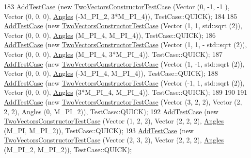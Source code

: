 \begin{DoxyCode}
183   \hyperlink{classns3_1_1TestCase_a3718088e3eefd5d6454569d2e0ddd835}{AddTestCase} (\textcolor{keyword}{new} \hyperlink{classTwoVectorsConstructorTestCase}{TwoVectorsConstructorTestCase} (Vector (0, -1, -1
      ),   Vector (0, 0, 0), \hyperlink{structns3_1_1Angles}{Angles} (-M\_PI\_2, 3*M\_PI\_4)), TestCase::QUICK);
184 
185   \hyperlink{classns3_1_1TestCase_a3718088e3eefd5d6454569d2e0ddd835}{AddTestCase} (\textcolor{keyword}{new} \hyperlink{classTwoVectorsConstructorTestCase}{TwoVectorsConstructorTestCase} (Vector (1, 1, 
      std::sqrt (2)),  Vector (0, 0, 0), \hyperlink{structns3_1_1Angles}{Angles} (M\_PI\_4, M\_PI\_4)), TestCase::QUICK);
186   \hyperlink{classns3_1_1TestCase_a3718088e3eefd5d6454569d2e0ddd835}{AddTestCase} (\textcolor{keyword}{new} \hyperlink{classTwoVectorsConstructorTestCase}{TwoVectorsConstructorTestCase} (Vector (1, 1, -
      std::sqrt (2)), Vector (0, 0, 0), \hyperlink{structns3_1_1Angles}{Angles} (M\_PI\_4, 3*M\_PI\_4)), TestCase::QUICK);
187   \hyperlink{classns3_1_1TestCase_a3718088e3eefd5d6454569d2e0ddd835}{AddTestCase} (\textcolor{keyword}{new} \hyperlink{classTwoVectorsConstructorTestCase}{TwoVectorsConstructorTestCase} (Vector (1, -1, 
      std::sqrt (2)), Vector (0, 0, 0), \hyperlink{structns3_1_1Angles}{Angles} (-M\_PI\_4, M\_PI\_4)), TestCase::QUICK);
188   \hyperlink{classns3_1_1TestCase_a3718088e3eefd5d6454569d2e0ddd835}{AddTestCase} (\textcolor{keyword}{new} \hyperlink{classTwoVectorsConstructorTestCase}{TwoVectorsConstructorTestCase} (Vector (-1, 1, 
      std::sqrt (2)), Vector (0, 0, 0), \hyperlink{structns3_1_1Angles}{Angles} (3*M\_PI\_4, M\_PI\_4)), TestCase::QUICK);
189 
190 
191   \hyperlink{classns3_1_1TestCase_a3718088e3eefd5d6454569d2e0ddd835}{AddTestCase} (\textcolor{keyword}{new} \hyperlink{classTwoVectorsConstructorTestCase}{TwoVectorsConstructorTestCase} (Vector (3, 2, 2),
           Vector (2, 2, 2), \hyperlink{structns3_1_1Angles}{Angles} (0, M\_PI\_2)), TestCase::QUICK);
192   \hyperlink{classns3_1_1TestCase_a3718088e3eefd5d6454569d2e0ddd835}{AddTestCase} (\textcolor{keyword}{new} \hyperlink{classTwoVectorsConstructorTestCase}{TwoVectorsConstructorTestCase} (Vector (1, 2, 2),
           Vector (2, 2, 2), \hyperlink{structns3_1_1Angles}{Angles} (M\_PI, M\_PI\_2)), TestCase::QUICK);
193   \hyperlink{classns3_1_1TestCase_a3718088e3eefd5d6454569d2e0ddd835}{AddTestCase} (\textcolor{keyword}{new} \hyperlink{classTwoVectorsConstructorTestCase}{TwoVectorsConstructorTestCase} (Vector (2, 3, 2),
           Vector (2, 2, 2), \hyperlink{structns3_1_1Angles}{Angles} (M\_PI\_2, M\_PI\_2)), TestCase::QUICK);

\end{DoxyCode}
